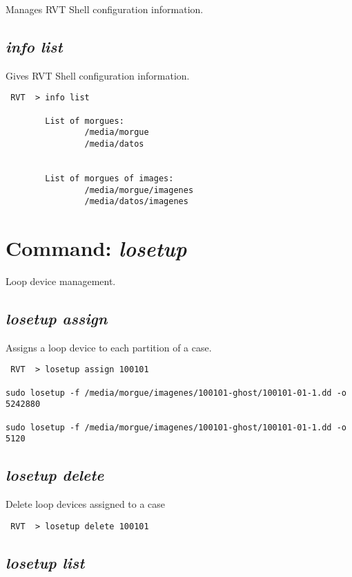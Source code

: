 \documentclass[a4paper,11pt,oneside]{report}
\begin{document}
Manages RVT Shell configuration information.

\subsection*{\emph{info list}}

Gives RVT Shell configuration information.

\begin{verbatim}
 RVT  > info list

        List of morgues:
                /media/morgue 
                /media/datos 


        List of morgues of images:
                /media/morgue/imagenes 
                /media/datos/imagenes 
\end{verbatim}


\section{Command: \emph{losetup}}

Loop device management.

\subsection*{\emph{losetup assign}}

Assigns a loop device to each partition of a case.

\begin{verbatim}
 RVT  > losetup assign 100101

sudo losetup -f /media/morgue/imagenes/100101-ghost/100101-01-1.dd -o 5242880

sudo losetup -f /media/morgue/imagenes/100101-ghost/100101-01-1.dd -o 5120
\end{verbatim}


\subsection*{\emph{losetup delete}}

Delete loop devices assigned to a case

\begin{verbatim}
 RVT  > losetup delete 100101
\end{verbatim}


\subsection*{\emph{losetup list}}
\end{document}
